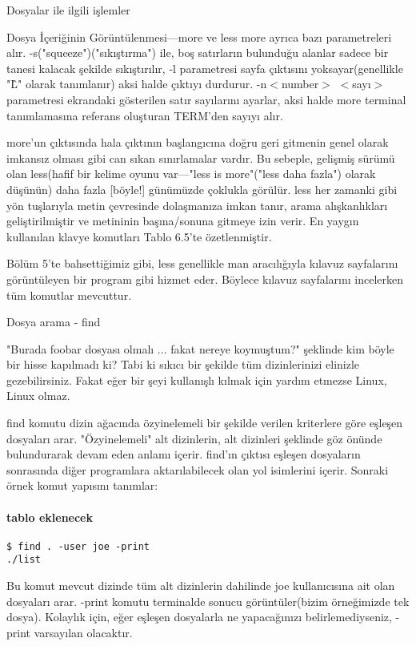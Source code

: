 \documentclass[10pt,a5paper]{book}
\begin{document}
\begin{section}{Dosyalar ile ilgili işlemler}
\begin{subsection}{Dosya İçeriğinin Görüntülenmesi—more ve less}
more ayrıca bazı parametreleri alır. -s("squeeze")("sıkıştırma") ile, boş satırların bulunduğu alanlar sadece bir tanesi kalacak şekilde sıkıştırılır, -l parametresi sayfa çıktısını yoksayar(genellikle "\^L" olarak tanımlanır) aksi halde çıktıyı durdurur. -n$<$number$>$ $<$sayı$>$ parametresi ekrandaki gösterilen satır sayılarını ayarlar, aksi halde more terminal tanımlamasına referans oluşturan TERM'den sayıyı alır.

more'un çıktısında hala çıktının başlangıcına doğru geri gitmenin genel olarak imkansız olması gibi can sıkan sınırlamalar vardır. Bu sebeple, gelişmiş sürümü olan less(hafif bir kelime oyunu var—"less is more"("less daha fazla") olarak düşünün) daha fazla [böyle!] günümüzde çoklukla görülür. less her zamanki gibi yön tuşlarıyla metin çevresinde dolaşmanıza imkan tanır, arama alışkanlıkları geliştirilmiştir ve metininin başına/sonuna gitmeye izin verir. En yaygın kullanılan klavye komutları Tablo 6.5'te özetlenmiştir.

Bölüm 5'te bahsettiğimiz gibi, less genellikle man aracılığıyla kılavuz sayfalarını görüntüleyen bir program gibi hizmet eder. Böylece kılavuz sayfalarını incelerken tüm komutlar mevcuttur.
\end{subsection}
\begin{subsection}{Dosya arama - find}

"Burada foobar dosyası olmalı ... fakat nereye koymuştum?" şeklinde kim böyle bir hisse kapılmadı ki? Tabi ki sıkıcı bir şekilde tüm dizinlerinizi elinizle gezebilirsiniz. Fakat eğer bir şeyi kullanışlı kılmak için yardım etmezse Linux, Linux olmaz.

find komutu dizin ağacında özyinelemeli bir şekilde verilen kriterlere göre eşleşen dosyaları arar. "Özyinelemeli" alt dizinlerin, alt dizinleri şeklinde göz önünde bulundurarak devam eden anlamı içerir. find'ın çıktısı eşleşen dosyaların sonrasında diğer programlara aktarılabilecek olan yol isimlerini içerir. Sonraki örnek komut yapısını tanımlar:

\paragraph{tablo eklenecek}{}

\begin{verbatim}
$ find . -user joe -print
./list
\end{verbatim}
Bu komut mevcut dizinde tüm alt dizinlerin dahilinde joe kullanıcısına ait olan dosyaları arar. -print komutu terminalde sonucu görüntüler(bizim örneğimizde tek dosya). Kolaylık için, eğer eşleşen dosyalarla ne yapacağınızı belirlemediyseniz, -print varsayılan olacaktır.


\end{subsection}
\end{section}
\end{document}
